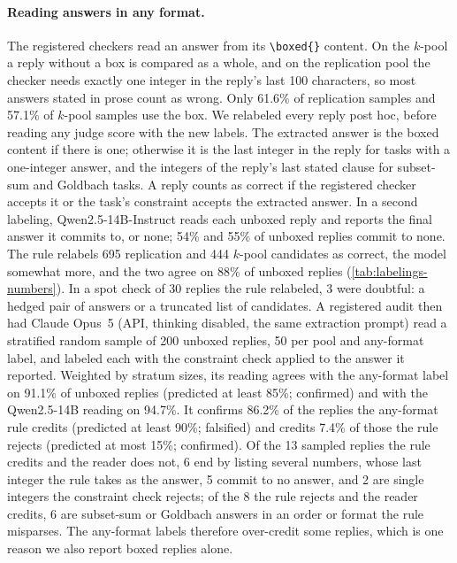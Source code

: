 \paragraph{Reading answers in any format.}
The registered checkers read an answer from its \texttt{\textbackslash boxed\{\}} content. On the $k$-pool a reply without a box is compared as a whole, and on the replication pool the checker needs exactly one integer in the reply's last 100 characters, so most answers stated in prose count as wrong. Only 61.6\% of replication samples and 57.1\% of $k$-pool samples use the box.
We relabeled every reply post hoc, before reading any judge score with the new labels. The extracted answer is the boxed content if there is one; otherwise it is the last integer in the reply for tasks with a one-integer answer, and the integers of the reply's last stated clause for subset-sum and Goldbach tasks. A reply counts as correct if the registered checker accepts it or the task's constraint accepts the extracted answer. In a second labeling, Qwen2.5-14B-Instruct reads each unboxed reply and reports the final answer it commits to, or none; 54\% and 55\% of unboxed replies commit to none. The rule relabels 695 replication and 444 $k$-pool candidates as correct, the model somewhat more, and the two agree on 88\% of unboxed replies (\cref{tab:labelings-numbers}). In a spot check of 30 replies the rule relabeled, 3 were doubtful: a hedged pair of answers or a truncated list of candidates. A registered audit then had Claude Opus~5 (API, thinking disabled, the same extraction prompt) read a stratified random sample of 200 unboxed replies, 50 per pool and any-format label, and labeled each with the constraint check applied to the answer it reported. Weighted by stratum sizes, its reading agrees with the any-format label on 91.1\% of unboxed replies (predicted at least 85\%; confirmed) and with the Qwen2.5-14B reading on 94.7\%. It confirms 86.2\% of the replies the any-format rule credits (predicted at least 90\%; falsified) and credits 7.4\% of those the rule rejects (predicted at most 15\%; confirmed). Of the 13 sampled replies the rule credits and the reader does not, 6 end by listing several numbers, whose last integer the rule takes as the answer, 5 commit to no answer, and 2 are single integers the constraint check rejects; of the 8 the rule rejects and the reader credits, 6 are subset-sum or Goldbach answers in an order or format the rule misparses. The any-format labels therefore over-credit some replies, which is one reason we also report boxed replies alone.
